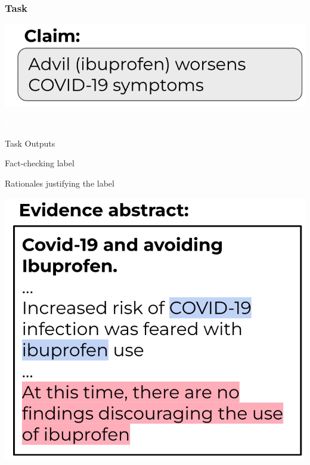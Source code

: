 \documentclass[13.5pt,aspecratio=169, xcolor=dvipsnames]{beamer}
\begin{document}



\begin{frame}
    \onehalfspacing
    \frametitle{Task}
    \begin{minipage}{0.47\textwidth}
        \includegraphics[width=\textwidth]{Claim.png}
         {
            \centering
            \begin{minipage}{0.7\textwidth}
            {
            \begin{block}{}
                \begin{center}
                    \textbf{\textcolor{white}{Label: Refuted}}
                \end{center}
            \end{block}
            }
            \end{minipage}     
        }
        
        \bigskip
         {
            \begin{flushleft}
            Task Outputs
            \begin{enumerate}
                \item Fact-checking label
                 {\item Rationales justifying the label}
            \end{enumerate}
            \end{flushleft}
        }

    \end{minipage}
    \begin{minipage}{0.45\textwidth}
        \includegraphics[width=1.2\textwidth]{Evidence_abstract.png}
        

\end{minipage}
\end{frame}
\end{document}

